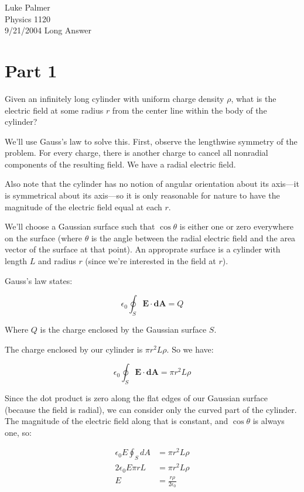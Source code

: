 \documentclass[12pt]{article}
\begin{document}
\noindent Luke Palmer \\
Physics 1120 \\
9/21/2004 Long Answer

\section*{Part 1}

Given an infinitely long cylinder with uniform charge density $\rho$,
what is the electric field at some radius $r$ from the center line
within the body of the cylinder?

We'll use Gauss's law to solve this.  First, observe the lengthwise
symmetry of the problem.  For every charge, there is another charge to
cancel all nonradial components of the resulting field.  We have a
radial electric field.

Also note that the cylinder has no notion of angular orientation about
its axis---it is symmetrical about its axis---so it is only reasonable
for nature to have the magnitude of the electric field equal at each
$r$.

We'll choose a Gaussian surface such that $\cos{\theta}$ is either one
or zero everywhere on the surface (where $\theta$ is the angle between
the radial electric field and the area vector of the surface at that
point).  An approprate surface is a cylinder with length $L$ and radius
$r$ (since we're interested in the field at $r$).

Gauss's law states:

\[
    \epsilon_0 \oint_S \mathbf{E} \cdot \mathbf{dA} = Q
\]

Where $Q$ is the charge enclosed by the Gaussian surface $S$.  

The charge enclosed by our cylinder is $\pi r^2 L\rho$.  So we have:

\[
    \epsilon_0 \oint_S \mathbf{E} \cdot \mathbf{dA} = \pi r^2 L\rho
\]

Since the dot product is zero along the flat edges of our Gaussian
surface (because the field is radial), we can consider only the curved
part of the cylinder.  The magnitude of the electric field along that is
constant, and $\cos{\theta}$ is always one, so:

\begin{align*}
    \epsilon_0 E \oint_S dA &= \pi r^2 L\rho \\
    2 \epsilon_0 E \pi r L  &= \pi r^2 L\rho \\
    E                       &= \frac{r \rho}{2 \epsilon_0}
\end{align*}
\end{document}
